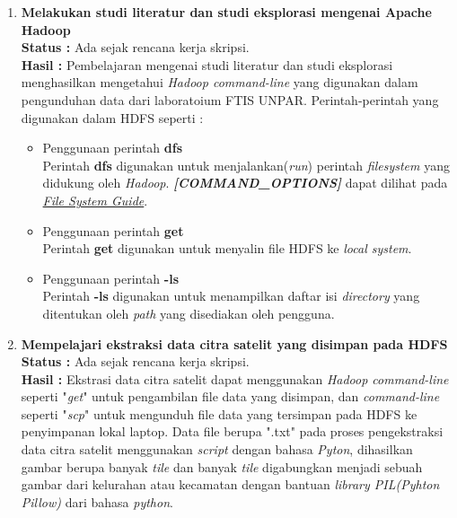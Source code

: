 \documentclass[a4paper,twoside]{article}
\begin{document}
\begin{enumerate}
		
		\item \textbf{Melakukan studi literatur dan studi eksplorasi mengenai Apache Hadoop}\\
		{\bf Status :} Ada sejak rencana kerja skripsi.\\
		{\bf Hasil :} Pembelajaran mengenai studi literatur dan studi eksplorasi menghasilkan mengetahui \textit{Hadoop command-line} yang digunakan dalam pengunduhan data dari laboratoium FTIS UNPAR. Perintah-perintah yang digunakan dalam HDFS seperti :
		\begin{itemize}
			\item Penggunaan perintah \textbf{dfs}\\
			Perintah \textbf{dfs} digunakan untuk menjalankan(\textit{run}) perintah \textit{filesystem} yang didukung oleh \textit{Hadoop}. \textit{\textbf{[COMMAND\_OPTIONS]}} dapat dilihat pada \href{https://hadoop.apache.org/docs/stable/hadoop-project-dist/hadoop-common/FileSystemShell.html}{\textit{File System Guide}}.
			
			\item Penggunaan perintah \textbf{get}\\
			Perintah \textbf{get} digunakan untuk menyalin file HDFS ke \textit{local system}.
			
			\item Penggunaan perintah \textbf{-ls}\\
			Perintah \textbf{-ls} digunakan untuk menampilkan daftar isi \textit{directory} yang ditentukan oleh \textit{path} yang disediakan oleh pengguna.
		\end{itemize}
		
		\item \textbf{Mempelajari ekstraksi data citra satelit yang disimpan pada HDFS}\\
		{\bf Status :} Ada sejak rencana kerja skripsi.\\
		{\bf Hasil :} Ekstrasi data citra satelit dapat menggunakan \textit{Hadoop command-line} seperti "\textit{get}" untuk pengambilan file data yang disimpan, dan \textit{command-line} seperti "\textit{scp}" untuk mengunduh file data yang tersimpan pada HDFS ke penyimpanan lokal laptop. Data file berupa ".txt" pada proses pengekstraksi data citra satelit menggunakan \textit{script} dengan bahasa \textit{Pyton}, dihasilkan gambar berupa banyak \textit{tile} dan banyak \textit{tile} digabungkan menjadi sebuah gambar dari kelurahan atau kecamatan dengan bantuan \textit{library PIL(Pyhton Pillow)} dari bahasa \textit{python}. 
		

\end{enumerate}
\end{document}
